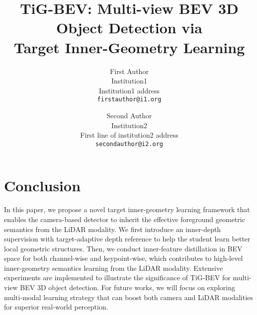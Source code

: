 \documentclass[10pt,twocolumn,letterpaper]{article}
\begin{document}

\title{TiG-BEV: Multi-view BEV 3D Object Detection via\\Target Inner-Geometry Learning}


\author{First Author\\
Institution1\\
Institution1 address\\
{\tt\small firstauthor@i1.org}
\and
Second Author\\
Institution2\\
First line of institution2 address\\
{\tt\small secondauthor@i2.org}
}
\maketitle







\section{Conclusion}
In this paper, we propose a novel target inner-geometry learning framework that enables the camera-based detector to inherit the effective foreground geometric semantics from the LiDAR modality. We first introduce an inner-depth supervision with target-adaptive depth reference to help the student learn better local geometric structures. Then, we conduct inner-feature distillation in BEV space for both channel-wise and keypoint-wise, which contributes to high-level inner-geometry semantics learning from the LiDAR modality. Extensive experiments are implemented to illustrate the significance of TiG-BEV for multi-view BEV 3D object detection. For future works, we will focus on exploring multi-modal learning strategy that can boost both camera and LiDAR modalities for superior real-world perception.

\end{document}
